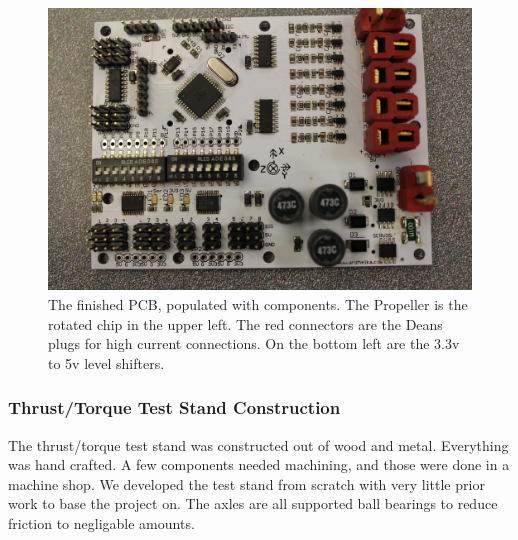 \documentclass{article}
\numberwithin{equation}{section} %
\begin{document}
\begin{figure}[h!]
  \centering
	\includegraphics[scale=.2]{populated_pcb_revA.JPG}
  \caption{The finished PCB, populated with components. The Propeller is the rotated chip in the upper left. The red connectors are the Deans plugs for high current connections. On the bottom left are the 3.3v to 5v level shifters.}
\end{figure}  


\subsubsection{Thrust/Torque Test Stand Construction}
The thrust/torque test stand was constructed out of wood and metal. Everything was hand crafted. A few components needed machining, and those were done in a machine shop. We developed the test stand from scratch with very little prior work to base the project on. The axles are all supported ball bearings to reduce friction to negligable amounts.
\end{document}
